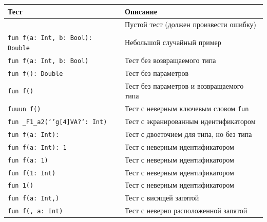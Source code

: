 \begin{center}
    \begin{tabular}{ll}\toprule
        Тест                                    & Описание                                     \\ \midrule
                                                & Пустой тест (должен произвести ошибку)       \\
        \texttt{fun f(a: Int, b: Bool): Double} & Небольшой случайный пример                   \\
        \texttt{fun f(a: Int, b: Bool)}         & Тест без возвращаемого типа                  \\
        \texttt{fun f(): Double}                & Тест без параметров                          \\
        \texttt{fun f()}                        & Тест без параметров и возвращаемого типа     \\
        \texttt{fuuun f()}                      & Тест с неверным ключевым словом \texttt{fun} \\
        \texttt{fun \_F1\_a2(`'g[4]VA?`: Int)}  & Тест с экранированным идентификатором        \\
        \texttt{fun f(a: Int):}                 & Тест с двоеточием для типа, но без типа      \\
        \texttt{fun f(a: Int): 1}               & Тест с неверным идентификатором              \\
        \texttt{fun f(a: 1)}                    & Тест с неверным идентификатором              \\
        \texttt{fun f(1: Int)}                  & Тест с неверным идентификатором              \\
        \texttt{fun 1()}                        & Тест с неверным идентификатором              \\
        \texttt{fun f(a: Int,)}                 & Тест с висящей запятой                       \\
        \texttt{fun f(, a: Int)}                & Тест с неверно расположенной запятой         \\
        \bottomrule
    \end{tabular}
\end{center}



